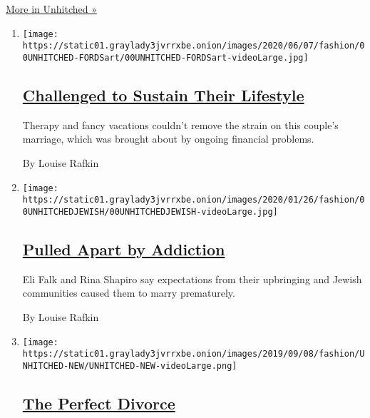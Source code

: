 \href{/column/unhitched}{More in Unhitched »}

\begin{enumerate}
\def\labelenumi{\arabic{enumi}.}
\item
  \texttt{[image: https://static01.graylady3jvrrxbe.onion/images/2020/06/07/fashion/00UNHITCHED-FORDSart/00UNHITCHED-FORDSart-videoLarge.jpg]}

  \hypertarget{challenged-to-sustain-their-lifestyle}{%
  \subsection{\texorpdfstring{\href{/2020/06/03/fashion/weddings/Unhitched-couple-discusses-their-marriage-and-divorce.html}{Challenged
  to Sustain Their
  Lifestyle}}{Challenged to Sustain Their Lifestyle}}\label{challenged-to-sustain-their-lifestyle}}

  Therapy and fancy vacations couldn't remove the strain on this
  couple's marriage, which was brought about by ongoing financial
  problems.

  By Louise Rafkin
\item
  \texttt{[image: https://static01.graylady3jvrrxbe.onion/images/2020/01/26/fashion/00UNHITCHEDJEWISH/00UNHITCHEDJEWISH-videoLarge.jpg]}

  \hypertarget{pulled-apart-by-addiction}{%
  \subsection{\texorpdfstring{\href{/2020/01/27/fashion/weddings/Unhitched-couple-is-pulled-apart-by-addiction.html}{Pulled
  Apart by
  Addiction}}{Pulled Apart by Addiction}}\label{pulled-apart-by-addiction}}

  Eli Falk and Rina Shapiro say expectations from their upbringing and
  Jewish communities caused them to marry prematurely.

  By Louise Rafkin
\item
  \texttt{[image: https://static01.graylady3jvrrxbe.onion/images/2019/09/08/fashion/UNHITCHED-NEW/UNHITCHED-NEW-videoLarge.png]}

  \hypertarget{the-perfect-divorce}{%
  \subsection{\texorpdfstring{\href{/interactive/2019/09/07/multimedia/how-to-get-divorced.html}{The
  Perfect Divorce}}{The Perfect Divorce}}\label{the-perfect-divorce}}


\end{enumerate}
